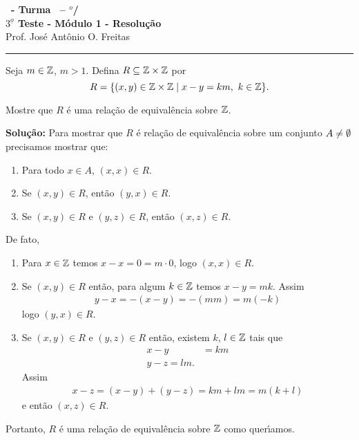 \documentclass[12pt]{exam}
\begin{document}
\begin{center}
{\Large\bf \disciplina\ - Turma \turma\ -- \semestre$^{o}$/\ano} \\ \vspace{9pt} {\large\bf
$3^{\underline{o}}$ Teste - M\'odulo 1 - Resolu\c{c}\~ao}\\
\vspace{9pt} Prof. Jos{\'e} Ant{\^o}nio O. Freitas
\end{center}
\hrule

\vspace{.6cm}

\questao Seja $m \in \mathbb{Z}$, $m > 1$. Defina $R \subseteq \mathbb{Z} \times \mathbb{Z}$ por
\[
	R = \{ (x, y) \in \z \times \z \mid x - y = km,\ k \in \z\}.
\]

Mostre que $R$ \'e uma rela\c{c}\~ao de equival\^encia sobre $\mathbb{Z}$.

\noindent\textbf{Solu\c{c}\~ao:} Para mostrar que $R$ \'e rela\c{c}\~ao de equival\^encia sobre um conjunto $A \ne \emptyset$ precisamos mostrar que:
\begin{enumerate}[label={\roman*})]
	\item Para todo $x \in A$, $(x, x) \in R$.
	\item Se $(x, y) \in R$, ent\~ao $(y, x) \in R$.
	\item Se $(x, y) \in R$ e $(y, z) \in R$, ent\~ao $(x, z) \in R$.
\end{enumerate}

De fato,
\begin{enumerate}[label={\roman*})]
	\item Para $x \in \mathbb{Z}$ temos $x - x = 0 = m\cdot 0$, logo $(x, x) \in R$.
	\item Se $(x, y)\in R$ ent\~ao, para algum $k \in \mathbb{Z}$ temos $x - y  = mk$. Assim
	\begin{align*}
		y - x = -(x - y) = -(mm) = m(-k)
	\end{align*}
	logo $(y, x) \in R$.
	\item Se $(x, y) \in R$ e $(y, z) \in R$ ent\~ao, existem $k$, $l \in \mathbb{Z}$ tais que
	\begin{align*}
		x - y &= km\\
		y - z = lm.
	\end{align*}
	Assim
	\begin{align*}
		x - z = (x - y) + (y - z) = km + lm = m(k + l)
	\end{align*}
	e então $(x, z) \in R$.
\end{enumerate}

Portanto, $R$ \'e uma rela\c{c}\~ao de equival\^encia sobre $\mathbb{Z}$ como quer{\'\i}amos.
\end{document}
